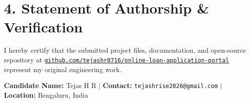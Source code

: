 \documentclass[11pt,a4paper]{article}
\begin{document}
\section{4. Statement of Authorship \& Verification}
I hereby certify that the submitted project files, documentation, and open-source repository at \href{https://github.com/tejashr0716/online-loan-application-portal}{\texttt{github.com/tejashr0716/online-loan-application-portal}} represent my original engineering work.

\vspace{10pt}
\textbf{Candidate Name:} Tejas H R \quad $|$ \quad \textbf{Contact:} \texttt{tejashrise2026@gmail.com} \quad $|$ \quad \textbf{Location:} Bengaluru, India
\end{document}
